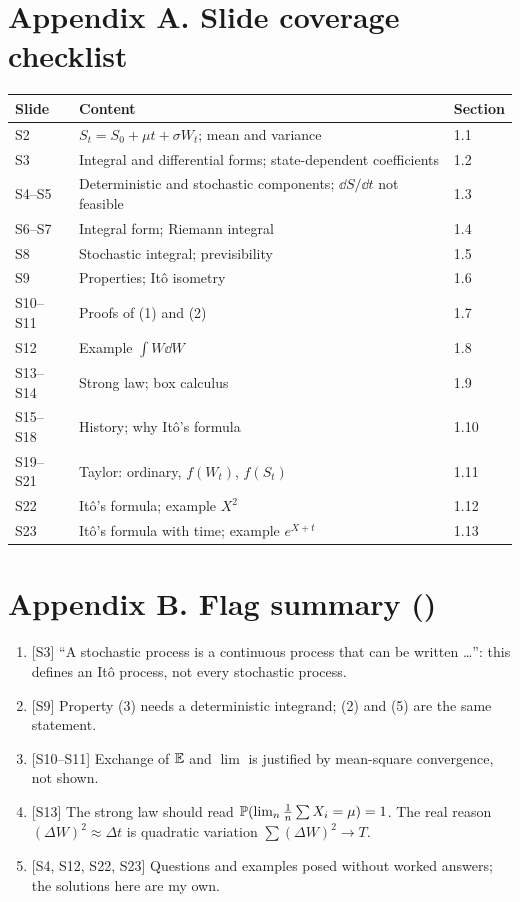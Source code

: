 \documentclass[10pt]{article}
\begin{document}
\section*{Appendix A. Slide coverage checklist}
{\small\begin{tabularx}{\linewidth}{@{}l X l@{}}\toprule
Slide & Content & Section\\\midrule
S2 & $S_t=S_0+\mu t+\sigma W_t$; mean and variance & 1.1\\
S3 & Integral and differential forms; state-dependent coefficients & 1.2\\
S4--S5 & Deterministic and stochastic components; $\dd S/\dd t$ not feasible & 1.3\\
S6--S7 & Integral form; Riemann integral & 1.4\\
S8 & Stochastic integral; previsibility & 1.5\\
S9 & Properties; It\^o isometry & 1.6\\
S10--S11 & Proofs of (1) and (2) & 1.7\\
S12 & Example $\int W\dd W$ & 1.8\\
S13--S14 & Strong law; box calculus & 1.9\\
S15--S18 & History; why It\^o's formula & 1.10\\
S19--S21 & Taylor: ordinary, $f(W_t)$, $f(S_t)$ & 1.11\\
S22 & It\^o's formula; example $X^2$ & 1.12\\
S23 & It\^o's formula with time; example $e^{X+t}$ & 1.13\\\bottomrule
\end{tabularx}}

\section*{Appendix B. Flag summary (\flag)}
\begin{enumerate}
\item {}[S3] ``A stochastic process is a continuous process that can be written \ldots'': this defines an It\^o process, not every stochastic process.
\item {}[S9] Property (3) needs a deterministic integrand; (2) and (5) are the same statement.
\item {}[S10--S11] Exchange of $\mathbb{E}$ and $\lim$ is justified by mean-square convergence, not shown.
\item {}[S13] The strong law should read $\mathbb{P}(\lim_n\frac1n\sum X_i=\mu)=1$. The real reason $(\Delta W)^2\approx\Delta t$ is quadratic variation $\sum(\Delta W)^2\to T$.
\item {}[S4, S12, S22, S23] Questions and examples posed without worked answers; the solutions here are my own.
\end{enumerate}
\end{document}
